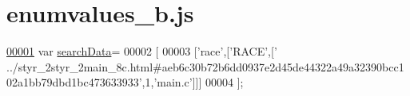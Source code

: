 \hypertarget{enumvalues__b_8js_source}{}\section{enumvalues\+\_\+b.\+js}
\label{enumvalues__b_8js_source}

\begin{DoxyCode}
\hypertarget{enumvalues__b_8js_source.tex_l00001}{}\hyperlink{enumvalues__b_8js_ad01a7523f103d6242ef9b0451861231e}{00001} var \hyperlink{enumvalues__b_8js_ad01a7523f103d6242ef9b0451861231e}{searchData}=
00002 [
00003   [\textcolor{stringliteral}{'race'},[\textcolor{stringliteral}{'RACE'},[\textcolor{stringliteral}{'
      ../styr\_2styr\_2main\_8c.html#aeb6c30b72b6dd0937e2d45de44322a49a32390bcc102a1bb79dbd1bc473633933'},1,\textcolor{stringliteral}{'main.c'}]]]
00004 ];
\end{DoxyCode}

